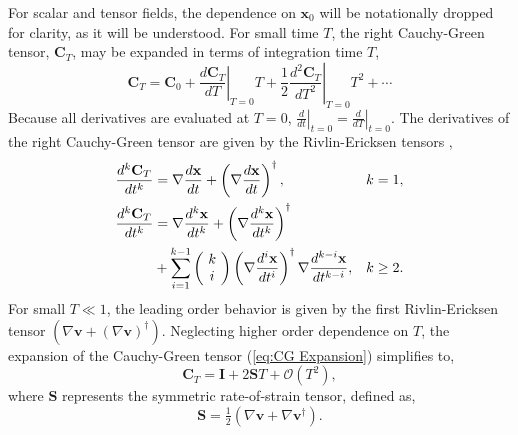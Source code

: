 \documentclass[twocolumn]{svjour3}
\newcommand{\edit}[3]{{\color{red} #2}}
\begin{document}
For scalar and tensor fields, the dependence on $\mathbf{x}_0$ will be notationally dropped for clarity, as it will be understood. For small time \(T\), the right Cauchy-Green tensor, \(\mathbf{C}_T  \), may be expanded in terms of integration time $T$,
\begin{equation}
\mathbf{C}_T   = \mathbf{C}_0+\left.\frac{d\mathbf{C}_T}{dT}\right|_{T=0}T + \frac{1}{2} \left.\frac{d^2\mathbf{C}_T}{dT^2}\right|_{T=0}T^2+ \cdots
\label{eq:CG Expansion}	
\end{equation}
Because all derivatives are evaluated at $T=0$, $\left.\tfrac{d}{dt}\right|_{t=0}=\left.\tfrac{d}{dT}\right|_{t=0}$. The derivatives of the right Cauchy-Green \edit{}{tensor}{7} are given by the Rivlin-Ericksen tensors \cite{truesdell2004non},
\edit{}{\begin{equation}
\begin{aligned}
\frac{d^k\mathbf{C}_T}{dt^k} &= \nabla\frac{d\mathbf{x}}{dt}+\left(\nabla\frac{d\mathbf{x}}{dt}\right)^\dagger, &k = 1,\\
\frac{d^k\mathbf{C}_T}{dt^k} &= \nabla\frac{d^k\mathbf{x}}{dt^k} + \left(\nabla\frac{d^k\mathbf{x}}{dt^k}\right)^\dagger & \\
\hfill& + \sum_{i=1}^{k-1}\left(\!\begin{array}{c}
k \\ i
\end{array}\!\right)\left(\nabla\frac{d^i\mathbf{x}}{dt^i}\right)^\dagger \nabla\frac{d^{k-i}\mathbf{x}}{dt^{k-i}}, &k \geq 2.
\end{aligned}
\end{equation}}{8,12}
For small $T\ll1$, the leading order behavior is given by the first \edit{Rivlin-Ericken}{Rivlin-Ericksen}{9} tensor $(\nabla\mathbf{v}+(\nabla\mathbf{v})^\dagger)$. Neglecting higher order dependence on $T$, the expansion of the Cauchy-Green tensor (\ref{eq:CG Expansion}) simplifies to,
\begin{equation}
\mathbf{C}_T   = \mathbf{I} + 2 \mathbf{S} T
+ \mathcal{O}(T^2),
\label{eq:Expansion2}
\end{equation}
where $\mathbf{S}$ represents the symmetric rate-of-strain tensor, defined as,
\begin{equation}
\mathbf{S}   = \tfrac{1}{2} \left( \nabla \mathbf{v}  + \nabla \mathbf{v} ^\dagger \right).
\end{equation}
\end{document}

